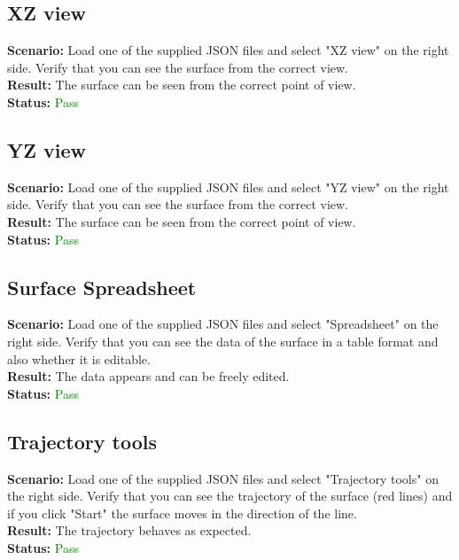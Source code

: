 \documentclass[a4paper, 11pt, article]{report}
\begin{document}
\subsection{XZ view}

\noindent \textbf{Scenario:} Load one of the supplied JSON files and select "XZ view" on the right side. Verify that you can see the surface from the correct view.
\\
\noindent \textbf{Result:} The surface can be seen from the correct point of view.
\\
\noindent \textbf{Status:} \textcolor{green}{Pass}

\subsection{YZ view}

\noindent \textbf{Scenario:} Load one of the supplied JSON files and select "YZ view" on the right side. Verify that you can see the surface from the correct view.
\\
\noindent \textbf{Result:} The surface can be seen from the correct point of view.
\\
\noindent \textbf{Status:} \textcolor{green}{Pass}

\subsection{Surface Spreadsheet}

\noindent \textbf{Scenario:} Load one of the supplied JSON files and select "Spreadsheet" on the right side. Verify that you can see the data of the surface in a table format and also whether it is editable.
\\
\noindent \textbf{Result:} The data appears and can be freely edited.
\\
\noindent \textbf{Status:} \textcolor{green}{Pass}

\subsection{Trajectory tools}

\noindent \textbf{Scenario:} Load one of the supplied JSON files and select "Trajectory tools" on the right side. Verify that you can see the trajectory of the surface (red lines) and if you click "Start" the surface moves in the direction of the line.
\\
\noindent \textbf{Result:} The trajectory behaves as expected.
\\
\noindent \textbf{Status:} \textcolor{green}{Pass}
\end{document}
